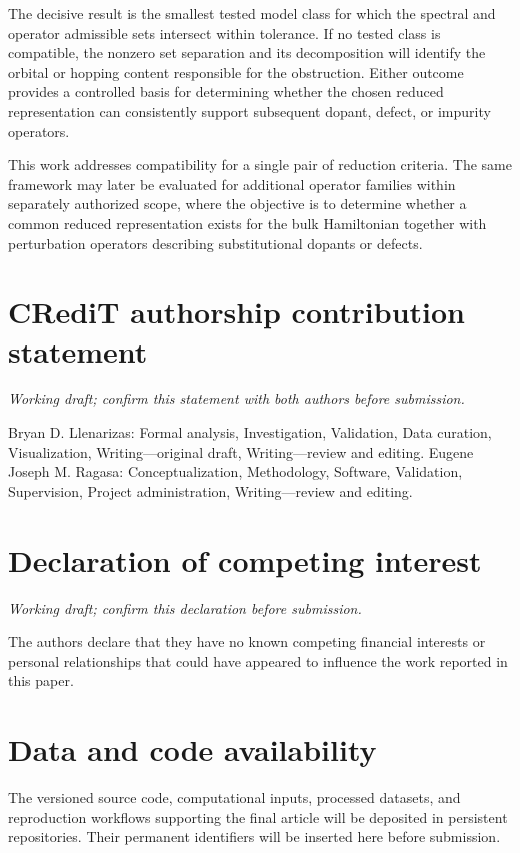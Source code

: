 \documentclass[preprint,12pt]{elsarticle}
\begin{document}
The decisive result is the smallest tested model class for which the spectral
and operator admissible sets intersect within tolerance. If no tested class is
compatible, the nonzero set separation and its decomposition will identify the
orbital or hopping content responsible for the obstruction. Either outcome
provides a controlled basis for determining whether the chosen reduced
representation can consistently support subsequent dopant, defect, or impurity
operators.

This work addresses compatibility for a single pair of reduction criteria. The
same framework may later be evaluated for additional operator families within
separately authorized scope, where the objective is to determine whether a
common reduced representation exists for the bulk Hamiltonian together with
perturbation operators describing substitutional dopants or defects.

\section*{CRediT authorship contribution statement}

\textit{Working draft; confirm this statement with both authors before submission.}

Bryan D. Llenarizas: Formal analysis, Investigation, Validation, Data curation,
Visualization, Writing---original draft, Writing---review and editing.
Eugene Joseph M. Ragasa: Conceptualization, Methodology, Software, Validation,
Supervision, Project administration, Writing---review and editing.

\section*{Declaration of competing interest}

\textit{Working draft; confirm this declaration before submission.}

The authors declare that they have no known competing financial interests or
personal relationships that could have appeared to influence the work reported
in this paper.

\section*{Data and code availability}

The versioned source code, computational inputs, processed datasets, and
reproduction workflows supporting the final article will be deposited in
persistent repositories. Their permanent identifiers will be inserted here
before submission.
\end{document}

